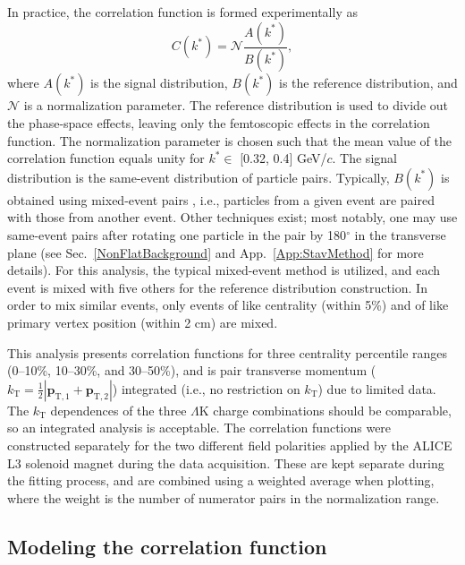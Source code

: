 \documentclass[ALICE,manyauthors]{cernphprep}
\newcommand{\kstar}{$k^{*}$\xspace}
\newcommand{\LamK}{$\Lambda$K\xspace}
\begin{document}
In practice, the correlation function is formed experimentally as
\begin{equation}
  C(k^{*}) = \mathcal{N}\frac{A(k^{*})}{B(k^{*})},
\label{eqn:CfExp}
\end{equation}
where $A(k^{*})$ is the signal distribution, $B(k^{*})$ is the reference distribution, and $\mathcal{N}$ is a normalization parameter.  
The reference distribution is used to divide out the phase-space effects, leaving only the femtoscopic effects in the correlation function. 
The normalization parameter is chosen such that the mean value of the correlation function equals unity for \kstar $\in$ [0.32, 0.4] GeV/$c$.
The signal distribution is the same-event distribution of particle pairs.
Typically, $B(k^{*})$ is obtained using mixed-event pairs \cite{Kopylov:1974th}, i.e., particles from a given event are paired with those from another event.
Other techniques exist; most notably, one may use same-event pairs after rotating one particle in the pair by 180$^\circ$ in the transverse plane (see Sec.\ \ref{NonFlatBackground} and App.\ \ref{App:StavMethod} for more details).
For this analysis, the typical mixed-event method is utilized, and each event is mixed with five others for the reference distribution construction.
In order to mix similar events, only events of like centrality (within 5\%) and of like primary vertex position (within 2 cm) are mixed.

This analysis presents correlation functions for three centrality percentile ranges (0--10\%, 10--30\%, and 30--50\%), and is pair transverse momentum ($k_{\mathrm{T}} = \frac{1}{2}|\mathbf{p}_{\mathrm{T,1}}+\mathbf{p}_{\mathrm{T,2}}|$) integrated (i.e., no restriction on $k_{\mathrm{T}}$) due to limited data.
The $k_{\mathrm{T}}$ dependences of the three \LamK charge combinations should be comparable, so an integrated analysis is acceptable.
The correlation functions were constructed separately for the two different field polarities applied by the ALICE L3 solenoid magnet during the data acquisition.
These are kept separate during the fitting process, and are combined using a weighted average when plotting, where the weight is the number of numerator pairs in the normalization range.

\subsection{Modeling the correlation function}
\label{sec:ModelingCF}
\end{document}
